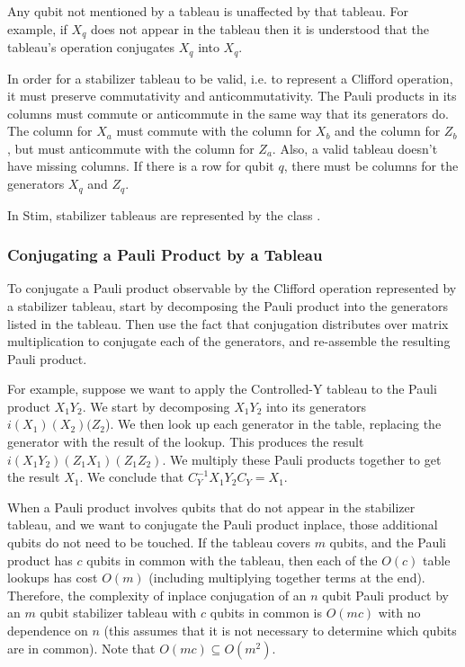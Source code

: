 \documentclass[onecolumn,unpublished]{quantumarticle}
\theoremstyle{definition}
\theoremstyle{definition}
\theoremstyle{definition}
\begin{document}
Any qubit not mentioned by a tableau is unaffected by that tableau.
For example, if $X_q$ does not appear in the tableau then it is understood that the tableau's operation conjugates $X_q$ into $X_q$.

In order for a stabilizer tableau to be valid, i.e. to represent a Clifford operation, it must preserve commutativity and anticommutativity.
The Pauli products in its columns must commute or anticommute in the same way that its generators do.
The column for $X_a$ must commute with the column for $X_b$ and the column for $Z_b$, but must anticommute with the column for $Z_a$.
Also, a valid tableau doesn't have missing columns.
If there is a row for qubit $q$, there must be columns for the generators $X_q$ and $Z_q$.

In Stim, stabilizer tableaus are represented by the class .

\subsubsection{Conjugating a Pauli Product by a Tableau}

To conjugate a Pauli product observable by the Clifford operation represented by a stabilizer tableau, start by decomposing the Pauli product into the generators listed in the tableau.
Then use the fact that conjugation distributes over matrix multiplication to conjugate each of the generators, and re-assemble the resulting Pauli product.

For example, suppose we want to apply the Controlled-Y tableau to the Pauli product $X_1 Y_2$.
We start by decomposing $X_1 Y_2$ into its generators $i (X_1) (X_2) (Z_2$).
We then look up each generator in the table, replacing the generator with the result of the lookup.
This produces the result $i (X_1 Y_2) (Z_1 X_1) (Z_1 Z_2)$.
We multiply these Pauli products together to get the result $X_1$.
We conclude that $C_Y^{-1} X_1 Y_2 C_Y = X_1$.

When a Pauli product involves qubits that do not appear in the stabilizer tableau, and we want to conjugate the Pauli product inplace, those additional qubits do not need to be touched.
If the tableau covers $m$ qubits, and the Pauli product has $c$ qubits in common with the tableau, then each of the $O(c)$ table lookups has cost $O(m)$ (including multiplying together terms at the end).
Therefore, the complexity of inplace conjugation of an $n$ qubit Pauli product by an $m$ qubit stabilizer tableau with $c$ qubits in common is $O(mc)$ with no dependence on $n$ (this assumes that it is not necessary to determine which qubits are in common).
Note that $O(mc) \subseteq O(m^2)$.
\end{document}
